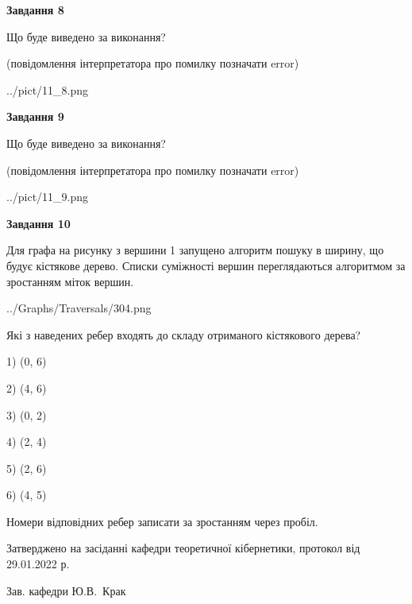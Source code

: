 \documentclass[12pt, ukrainian]{article}
\begin{document}
{\begin {large}
{\begin {center}\textbf{Завдання 8}\end {center}}\par
Що буде виведено за виконання?\par
 (повідомлення інтерпретатора про помилку позначати error)\par
\begin{center}
	{../pict/11_8.png}
\end{center}
\newpage

{\begin {center}\textbf{Завдання 9}\end {center}}\par
Що буде виведено за виконання?\par
 (повідомлення інтерпретатора про помилку позначати error)\par
\begin{center}
	{../pict/11_9.png}
\end{center}
\newpage

{\begin {center}\textbf{Завдання 10}\end {center}}\par
Для графа на рисунку з вершини 1 запущено алгоритм пошуку в ширину, що будує кістякове дерево. Списки суміжності вершин переглядаються алгоритмом за зростанням міток вершин.\par
\begin{center}
	{../Graphs/Traversals/304.png}
\end{center}
\par Які з наведених ребер входять до складу отриманого кістякового дерева?\par
1) (0, 6)\par
2) (4, 6)\par
3) (0, 2)\par
4) (2, 4)\par
5) (2, 6)\par
6) (4, 5)\par
{\vskip 15pt} Номери відповідних ребер записати за зростанням через пробіл.\par
\newpage


\end {large}
}
{\smallskip \begin {small} Затверджено на засіданні кафедри теоретичної кібернетики, протокол  від   29.01.2022 р.\par\smallskip\smallskip
{\parbox {6.5 cm}{Зав. кафедри \dotfill Ю.В.~Крак}} \end{small}}
\end{document}
